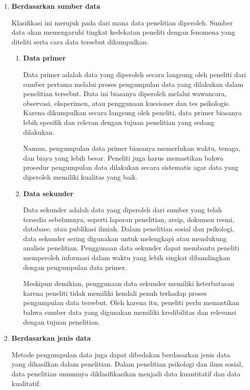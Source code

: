 \documentclass[
  indonesian,
  letterpaper,
  DIV=11,
  numbers=noendperiod]{scrreprt}
\begin{document}
\begin{enumerate}
\def\labelenumi{\arabic{enumi}.}
\item
  \textbf{Berdasarkan sumber data}

  Klasifikasi ini merujuk pada dari mana data penelitian diperoleh.
  Sumber data akan memengaruhi tingkat kedekatan peneliti dengan
  fenomena yang diteliti serta cara data tersebut dikumpulkan.

  \begin{enumerate}
  \def\labelenumii{\alph{enumii}.}
  \item
    \textbf{Data primer}

    Data primer adalah data yang diperoleh secara langsung oleh peneliti
    dari sumber pertama melalui proses pengumpulan data yang dilakukan
    dalam penelitian tersebut. Data ini biasanya diperoleh melalui
    wawancara, observasi, eksperimen, atau penggunaan kuesioner dan tes
    psikologis. Karena dikumpulkan secara langsung oleh peneliti, data
    primer biasanya lebih spesifik dan relevan dengan tujuan penelitian
    yang sedang dilakukan.

    Namun, pengumpulan data primer biasanya memerlukan waktu, tenaga,
    dan biaya yang lebih besar. Peneliti juga harus memastikan bahwa
    prosedur pengumpulan data dilakukan secara sistematis agar data yang
    diperoleh memiliki kualitas yang baik.
  \item
    \textbf{Data sekunder}

    Data sekunder adalah data yang diperoleh dari sumber yang telah
    tersedia sebelumnya, seperti laporan penelitian, arsip, dokumen
    resmi, database, atau publikasi ilmiah. Dalam penelitian sosial dan
    psikologi, data sekunder sering digunakan untuk melengkapi atau
    mendukung analisis penelitian. Penggunaan data sekunder dapat
    membantu peneliti memperoleh informasi dalam waktu yang lebih
    singkat dibandingkan dengan pengumpulan data primer.

    Meskipun demikian, penggunaan data sekunder memiliki keterbatasan
    karena peneliti tidak memiliki kendali penuh terhadap proses
    pengumpulan data tersebut. Oleh karena itu, peneliti perlu
    memastikan bahwa sumber data yang digunakan memiliki kredibilitas
    dan relevansi dengan tujuan penelitian.
  \end{enumerate}
\item
  \textbf{Berdasarkan jenis data}

  Metode pengumpulan data juga dapat dibedakan berdasarkan jenis data
  yang dihasilkan dalam penelitian. Dalam penelitian psikologi dan ilmu
  sosial, data penelitian umumnya diklasifikasikan menjadi data
  kuantitatif dan data kualitatif.


\end{enumerate}
\end{document}
